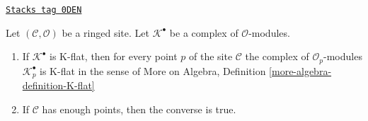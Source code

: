 \begin{lemma}
\label{sites-cohomology-lemma-check-K-flat-stalks}
\href{https://stacks.math.columbia.edu/tag/0DEN}{\texttt{Stacks tag 0DEN}}

Let $(\mathcal{C}, \mathcal{O})$ be a ringed site.
Let $\mathcal{K}^\bullet$ be a complex of $\mathcal{O}$-modules.
\begin{enumerate}
\item If $\mathcal{K}^\bullet$ is K-flat, then for every point $p$
of the site $\mathcal{C}$ the complex of $\mathcal{O}_p$-modules
$\mathcal{K}_p^\bullet$ is K-flat in the sense of
More on Algebra, Definition \ref{more-algebra-definition-K-flat}
\item If $\mathcal{C}$ has enough points, then the converse is true.
\end{enumerate}
\end{lemma}

